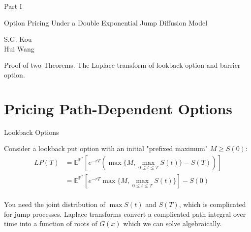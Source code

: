 \documentclass{beamer}
\begin{document}
\begin{frame}{Part I}
    \begin{center}
        Option Pricing Under a Double Exponential Jump Diffusion Model
    \end{center}
    \vspace{2em}
    \begin{center}
        S.G. Kou\\
        Hui Wang
    \end{center}
    \vspace{3em}
    \par Proof of two Theorems. The Laplace transform of lookback option and barrier option.
 \end{frame}
\section{Pricing Path-Dependent Options}
\begin{frame}{Lookback Options}

    {\footnotesize \footnotesize
    \par Consider a lookback put option with an initial "prefixed maximum" \( M \geq S(0) \):
    \vspace{1em}
    \begin{align*}
        LP(T) &= \mathbb{E}^{\mathbb{P}^*} \left[ e^{-rT} \left( \max\{M, \max_{0 \leq t \leq T} S(t)\} - S(T) \right) \right]\\
        & =   \mathbb{E}^{\mathbb{P}^*}\left[ e^{-rT} \max\{M, \max_{0 \leq t \leq T} S(t)\} \right] - S(0)\\
    \end{align*}

    \par You need the joint distribution of $\max S(t)$ and $S(T)$, which is complicated for jump processes. 
    Laplace transforms convert a complicated path integral over time into a function of roots of $G(x)$
    which we can solve algebraically.
    }
    
\end{frame}
\end{document}
